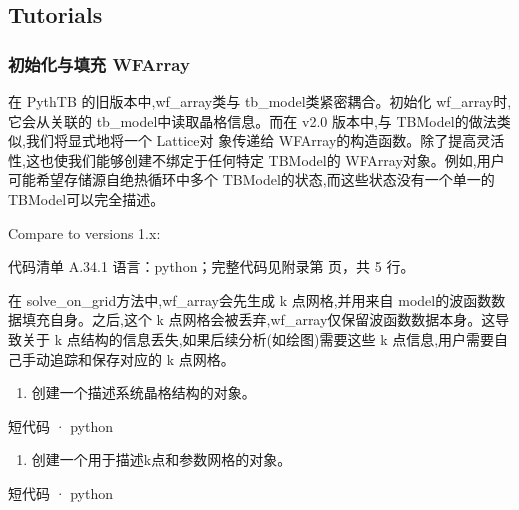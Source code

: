 \documentclass[lang=cn,scheme=chinese,color=blue,device=normal,toc=onecol,math=cm]{elegantbook}
\begin{document}
\subsection{Tutorials}


\subsubsection{初始化与填充 WFArray}


在 PythTB 的旧版本中,wf\_\allowbreak{}array类与 tb\_\allowbreak{}model类紧密耦合。初始化 wf\_\allowbreak{}array时,它会从关联的 tb\_\allowbreak{}model中读取晶格信息。而在 v2.0 版本中,与 TBModel的做法类似,我们将显式地将一个 Lattice对 象传递给 WFArray的构造函数。除了提高灵活性,这也使我们能够创建不绑定于任何特定 TBModel的 WFArray对象。例如,用户可能希望存储源自绝热循环中多个 TBModel的状态,而这些状态没有一个单一的 TBModel可以完全描述。\par


Compare to versions 1.x:\par


\begin{codeindexbox}{代码清单 A.34.1}
语言：python；完整代码见附录第 \pageref{code:34:1} 页，共 5 行。
\end{codeindexbox}


在 solve\_\allowbreak{}on\_\allowbreak{}grid方法中,wf\_\allowbreak{}array会先生成 k 点网格,并用来自 model的波函数数据填充自身。之后,这个 k 点网格会被丢弃,wf\_\allowbreak{}array仅保留波函数数据本身。这导致关于 k 点结构的信息丢失,如果后续分析(如绘图)需要这些 k 点信息,用户需要自己手动追踪和保存对应的 k 点网格。\par


\begin{enumerate}
\item 创建一个描述系统晶格结构的对象。
\end{enumerate}


\begin{inlinecodebox}{短代码 · python}
\end{inlinecodebox}


\begin{enumerate}
\item 创建一个用于描述k点和参数网格的对象。
\end{enumerate}


\begin{inlinecodebox}{短代码 · python}
\end{inlinecodebox}
\end{document}
